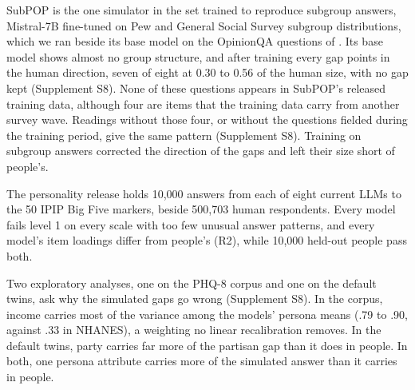 SubPOP \citep{suh2025subpop} is the one simulator in the set trained to reproduce subgroup answers, Mistral-7B \citep{jiang2023mistral} fine-tuned on Pew and General Social Survey subgroup distributions, which we ran beside its base model on the OpinionQA questions of \citet{meister2025distributional}.
Its base model shows almost no group structure, and after training every gap points in the human direction, seven of eight at 0.30 to 0.56 of the human size, with no gap kept (Supplement S8). %
None of these questions appears in SubPOP's released training data, although four are items that the training data carry from another survey wave. %
Readings without those four, or without the questions fielded during the training period, give the same pattern (Supplement S8). %
Training on subgroup answers corrected the direction of the gaps and left their size short of people's.

The personality release \citep{ipipaudit2026} holds 10,000 answers from each of eight current LLMs to the 50 IPIP Big Five markers, beside 500,703 human respondents. %
Every model fails level 1 on every scale with too few unusual answer patterns, and every model's item loadings differ from people's (R2), while 10,000 held-out people pass both. %

Two exploratory analyses, one on the PHQ-8 corpus and one on the default twins, ask why the simulated gaps go wrong (Supplement S8).
In the corpus, income carries most of the variance among the models' persona means (.79 to .90, against .33 in NHANES), a weighting no linear recalibration removes. %
In the default twins, party carries far more of the partisan gap than it does in people. %
In both, one persona attribute carries more of the simulated answer than it carries in people.

